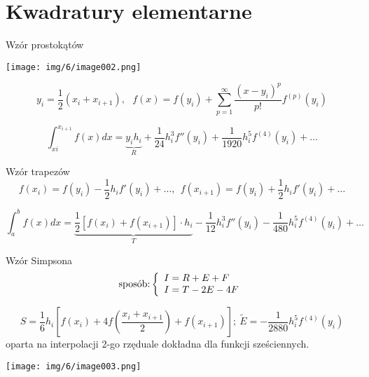 \section{Kwadratury elementarne}
	\begin{frame}{Wzór prostokątów}
      	\begin{center}
      		\texttt{[image: img/6/image002.png]}
      	\end{center}
        
		$$
y_{i}= \frac{1}{2}(x_{i}+x_{i+1}),\ \ \ f(x)=f(y_{i})+ \sum_{p=1}^{\infty}\frac{(x-y_{i})^{p}}{p!}f^{(p)}(y_{i})
		$$
        
		$$
\int_{xi}^{x_{i+1}}f(x)dx=\underbrace{y_{i}h_{i}}_{R}+\frac{1}{24}h_{i}^{3}f''(y_{i})+\frac{1}{1920}h_{i}^{5}f^{(4)}(y_{i})+\ldots
		$$
	\end{frame}
	\begin{frame}{Wzór trapezów}
    	$$
f(x_{i})=f(y_{i})- \frac{1}{2}h_{i}f'(y_{i})+\ldots,\ \ f(x_{i+1})=f(y_{i})+ \frac{1}{2}h_{i}f'(y_{i})+\ldots
        $$
        
		$$
\int_{a}^{b}f(x)dx=\underbrace{\frac{1}{2}[f(x_{i}) + f(x_{i+1})] \cdot h_{i}}_{T} - \frac{1}{12}h_{i}^{3} f''(y_{i})-\frac{1}{480}h_{i}^{5}f^{(4)}(y_{i})+\ldots
		$$ 
	\end{frame}
	\begin{frame}{Wzór Simpsona}
		$$
        \textnormal{sposób:} \left\{\begin{array}{l}
  			I = R + E + F \\
        	I = T - 2E - 4F
        \end{array}\right.
        $$
        
        $$
S = \frac{1}{6}h_{i}[f(x_{i})+4f(\frac{x_{i}+x_{i+1}}{2})+f(x_{i+1})];\ \tilde{E}=-\frac{1}{2880}h_{i}^{5}f^{(4)}(y_{i})
		$$
        oparta na interpolacji 2-go rzędu\newline ale dokładna dla funkcji sześciennych.
        
      	\begin{center}
      		\texttt{[image: img/6/image003.png]}
      	\end{center}
	\end{frame}
